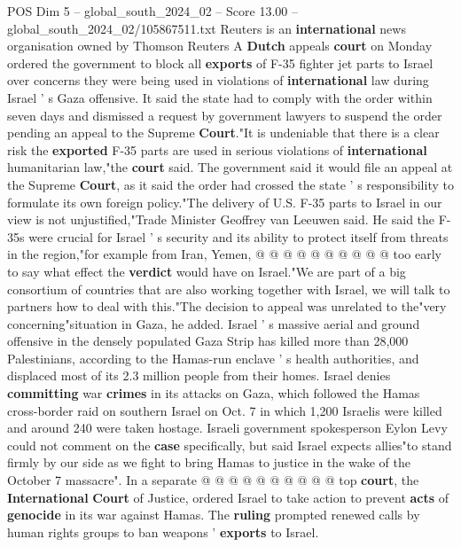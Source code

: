 \begin{textsample}{POS Dim 5 – global\_south\_2024\_02 – Score 13.00 – global\_south\_2024\_02/105867511.txt}  \label{ex:f5_pos_197}
Reuters is an \textbf{international} news organisation owned by Thomson Reuters A \textbf{Dutch} appeals \textbf{court} on Monday ordered the government to block all \textbf{exports} of F-35 fighter jet parts to Israel over concerns they were being used in violations of \textbf{international} law during Israel ' s Gaza offensive.
It said the state had to comply with the order within seven days and dismissed a request by government lawyers to suspend the order pending an appeal to the Supreme \textbf{Court}."It is undeniable that there is a clear risk the \textbf{exported} F-35 parts are used in serious violations of \textbf{international} humanitarian law,"the \textbf{court} said.
The government said it would file an appeal at the Supreme \textbf{Court}, as it said the order had crossed the state ' s responsibility to formulate its own foreign policy."The delivery of U.S.
F-35 parts to Israel in our view is not unjustified,"Trade Minister Geoffrey van Leeuwen said.
He said the F-35s were crucial for Israel ' s security and its ability to protect itself from threats in the region,"for example from Iran, Yemen, @ @ @ @ @ @ @ @ @ @ too early to say what effect the \textbf{verdict} would have on Israel."We are part of a big consortium of countries that are also working together with Israel, we will talk to partners how to deal with this."The decision to appeal was unrelated to the"very concerning"situation in Gaza, he added.
Israel ' s massive aerial and ground offensive in the densely populated Gaza Strip has killed more than 28,000 Palestinians, according to the Hamas-run enclave ' s health authorities, and displaced most of its 2.3 million people from their homes.
Israel denies \textbf{committing} war \textbf{crimes} in its attacks on Gaza, which followed the Hamas cross-border raid on southern Israel on Oct. 7 in which 1,200 Israelis were killed and around 240 were taken hostage.
Israeli government spokesperson Eylon Levy could not comment on the \textbf{case} specifically, but said Israel expects allies"to stand firmly by our side as we fight to bring Hamas to justice in the wake of the October 7 massacre".
In a separate @ @ @ @ @ @ @ @ @ @ top \textbf{court}, the \textbf{International} \textbf{Court} of Justice, ordered Israel to take action to prevent \textbf{acts} of \textbf{genocide} in its war against Hamas.
The \textbf{ruling} prompted renewed calls by human rights groups to ban weapons ' \textbf{exports} to Israel.

\end{textsample}
